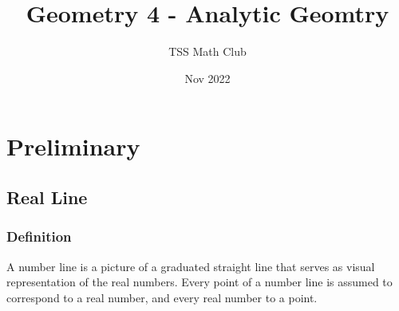 \documentclass{article}
\title{Geometry 4 - Analytic Geomtry}
\author{TSS Math Club}
\date{Nov 2022}
\begin{document}
\maketitle

\section{Preliminary}




\subsection{Real Line}

\subsubsection{Definition}

A number line is a picture of a graduated straight line that serves as visual representation of the real numbers. Every point of a number line is assumed to correspond to a real number, and every real number to a point.



\end{document}
